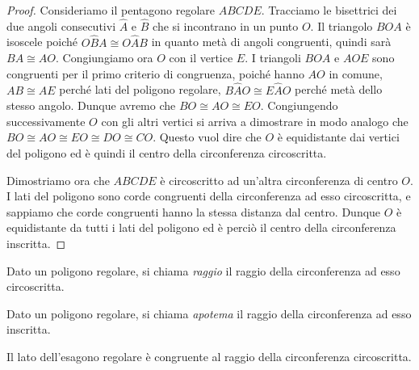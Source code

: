 \begin{proof}
Consideriamo il pentagono regolare \(ABCDE\). Tracciamo le bisettrici 
dei due angoli consecutivi \(\widehat{A}\) e \(\widehat{B}\) che si 
incontrano in un punto \(O\). Il triangolo \(BOA\) è isoscele poiché 
\(O\widehat{B}A\cong O\widehat{A}B\) in quanto metà di angoli 
congruenti, quindi sarà \(BA\cong AO\). Congiungiamo ora \(O\) con il 
vertice \(E\). I triangoli \(BOA\) e \(AOE\) sono congruenti per il primo 
criterio di congruenza, poiché hanno \(AO\) in comune, \(AB\cong AE\) 
perché lati del poligono regolare, \(B\widehat{A}O\cong E\widehat{A}O\) 
perché metà dello stesso angolo. Dunque avremo che \(BO\cong AO\cong 
EO\). Congiungendo successivamente \(O\) con gli altri vertici si arriva 
a dimostrare in modo analogo che \(BO\cong AO\cong EO\cong DO\cong 
CO\). Questo vuol dire che \(O\) è equidistante dai vertici del poligono 
ed è quindi il centro della circonferenza circoscritta.

Dimostriamo ora che \(ABCDE\) è circoscritto ad un'altra circonferenza 
di centro \(O\). I lati del poligono sono corde congruenti della 
circonferenza ad esso circoscritta, e sappiamo che corde congruenti 
hanno la stessa distanza dal centro. Dunque \(O\) è equidistante da 
tutti i lati del poligono ed è perciò il centro della circonferenza 
inscritta. 
\end{proof}

\begin{definizione}
Dato un poligono regolare, si chiama \emph{raggio} il raggio della 
circonferenza ad esso circoscritta.
\end{definizione}

\begin{definizione}
Dato un poligono regolare, si chiama \emph{apotema} il raggio della 
circonferenza ad esso inscritta.
\end{definizione}

\begin{teorema}
Il lato dell'esagono regolare è congruente al raggio della 
circonferenza circoscritta.
\end{teorema}


\begin{inaccessibleblock}
 \begin{figure}[!htb]
	\centering
\end{figure}
\end{inaccessibleblock}

